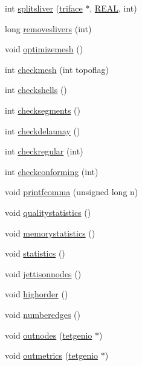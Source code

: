 \begin{DoxyCompactItemize}
\item 
int \hyperlink{classtetgenmesh_aa9540f310c97db99c989a02b0978ceec}{splitsliver} (\hyperlink{classtetgenmesh_1_1triface}{triface} $\ast$, \hyperlink{tetgen_8h_a4b654506f18b8bfd61ad2a29a7e38c25}{R\+E\+AL}, int)
\item 
long \hyperlink{classtetgenmesh_ad5c46c2f6c9adeed23fc8c64b682778d}{removeslivers} (int)
\item 
void \hyperlink{classtetgenmesh_a8bb5c6ad8ccfa57f2a84e5a78295b263}{optimizemesh} ()
\item 
int \hyperlink{classtetgenmesh_ad651dfc786ffccea226a0bf786f94222}{checkmesh} (int topoflag)
\item 
int \hyperlink{classtetgenmesh_a1db73573a8d3fdfe9da17556b6aacad4}{checkshells} ()
\item 
int \hyperlink{classtetgenmesh_ae2cbec9eb2c18f23e2046780841c9f6a}{checksegments} ()
\item 
int \hyperlink{classtetgenmesh_aa49e45f69ca54da5e57339bb72346a76}{checkdelaunay} ()
\item 
int \hyperlink{classtetgenmesh_a4acb9c2400d8d496b0e546f59eb0e9a8}{checkregular} (int)
\item 
int \hyperlink{classtetgenmesh_aa7ff4d59b68391bc6eb4998017a43b77}{checkconforming} (int)
\item 
void \hyperlink{classtetgenmesh_ae37cd75094463b36d4f1051e7312ca00}{printfcomma} (unsigned long n)
\item 
void \hyperlink{classtetgenmesh_a472328a6a8fe8076ed0443e3b2cab4c1}{qualitystatistics} ()
\item 
void \hyperlink{classtetgenmesh_a0210508dcc8f64449ed5ffe957a45fd2}{memorystatistics} ()
\item 
void \hyperlink{classtetgenmesh_a2e85077125aa1c4d2dcd0c8e58eac9a0}{statistics} ()
\item 
void \hyperlink{classtetgenmesh_a2ceb55fb1e757b0083a41ad34aabab56}{jettisonnodes} ()
\item 
void \hyperlink{classtetgenmesh_a2442f784a429111586a323a185009e68}{highorder} ()
\item 
void \hyperlink{classtetgenmesh_a1dd758a62fcc10e6aba7ddbacf188270}{numberedges} ()
\item 
void \hyperlink{classtetgenmesh_a7822fa38f096959d128175922aa57460}{outnodes} (\hyperlink{classtetgenio}{tetgenio} $\ast$)
\item 
void \hyperlink{classtetgenmesh_a7f7239417b0e75bb293eaba2f2ff4ff8}{outmetrics} (\hyperlink{classtetgenio}{tetgenio} $\ast$)
\item 

\end{DoxyCompactItemize}
